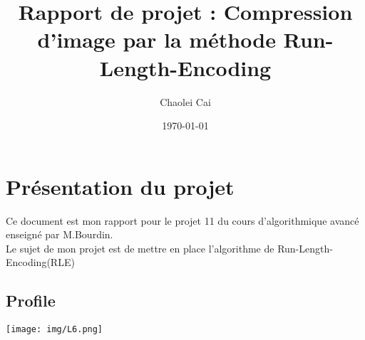 \documentclass[12pt, letterpaper]{article}
\title{Rapport de projet : Compression d'image par la méthode Run-Length-Encoding}
\author{Chaolei Cai
\\
  \multicolumn{1}{
      p{.7\textwidth}}{\centering\emph{Université Paris Vincennes St-Denis\\
  UFR mathématiques, informatique, technologies sciences de l'information\\}
  L3 Informatique}
}
\date{\today}
\begin{document}
\begin{titlepage}
    \maketitle
\end{titlepage}

\tableofcontents

\section{Présentation du projet}
Ce document est mon rapport pour le projet 11 du cours d'algorithmique avancé enseigné par M.Bourdin.\\
Le sujet de mon projet est de mettre en place l'algorithme de Run-Length-Encoding(RLE)\\



\subsection{Profile}
\texttt{[image: img/L6.png]}
\end{document}
